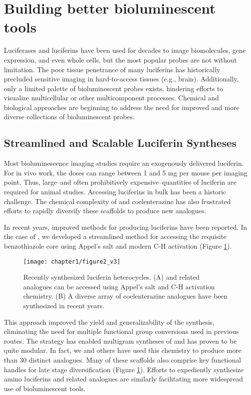 \section{Building better bioluminescent tools}
Luciferases and luciferins have been used for decades to image
biomolecules, gene expression, and even whole cells, but the
most popular probes are not without limitation.\cite{RN26} The poor
tissue penetrance of many luciferins has historically precluded
sensitive imaging in hard-to-access tissues (e.g., brain).
Additionally, only a limited palette of bioluminescent probes
exists, hindering efforts to visualize multicellular or other
multicomponent processes. Chemical and biological approaches
are beginning to address the need for improved and
more diverse collections of bioluminescent probes.
\subsection*{Streamlined and Scalable Luciferin Syntheses}
Most bioluminescence imaging studies require an exogenously
delivered luciferin. For in vivo work, the doses can range
between 1 and 5 mg per mouse per imaging point. Thus,
large--and often prohibitively expensive--quantities of luciferin
are required for animal studies. Accessing luciferins in bulk
has been a historic challenge. The chemical complexity of \dluciferin{}
and coelenterazine has also frustrated efforts to rapidly
diversify these scaffolds to produce new analogues.

In recent years, improved methods for producing luciferins
have been reported. In the case of \dluciferin{}, we developed a
streamlined method for accessing the requisite benzothiazole
core using Appel's salt and modern C-H activation (Figure \ref{fig:luc_derivatives}).\cite{McCutcheon:2012ixb}
\begin{figure}[htbp]
\texttt{[image: chapter1/figure2\_v3]}
\centering
\caption[Recently synthesized luciferin heterocycles]{Recently synthesized luciferin heterocycles. (A) \dluciferin{}
and related analogues can be accessed using Appel's salt and C-H
activation chemistry. (B) A diverse array of coelenterazine analogues
have been synthesized in recent years.}
  \label{fig:luc_derivatives}
\end{figure}
This approach improved the yield and generalizability of
the synthesis, eliminating the need for multiple functional
group conversions used in previous routes. The strategy has
enabled multigram syntheses of \dluciferin{} and has proven to
be quite modular. In fact, we and others have used this
chemistry to produce more than 30 distinct analogues.\cite{Woodroofe:2012vx} Many
of these scaffolds also comprise key functional handles for late stage
diversification (Figure \ref{fig:luc_derivatives}). Efforts to expediently
synthesize amino luciferins\cite{Hauser:2016jt} and related analogues\cite{Anderson:2017hb} are similarly
facilitating more widespread use of bioluminescent tools.


